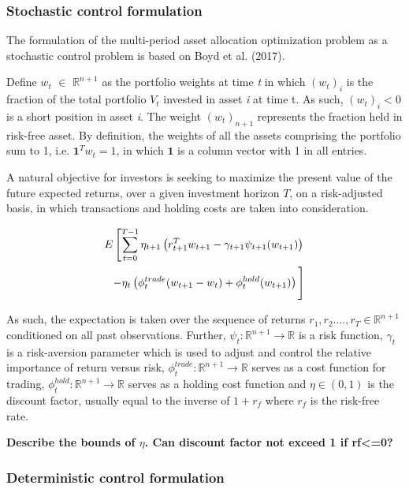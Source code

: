 \subsubsection{Stochastic control formulation}
The formulation of the multi-period asset allocation optimization problem as a stochastic control problem is based on Boyd et al. (2017). 

Define $w_t$ $\in$ $\mathbb{R}^{n+1}$ as the portfolio weights at time \textit{t} in which $(w_t)_{i}$ is the fraction of the total portfolio $V_t$ invested in asset \textit{i} at time t. As such, $(w_t)_{i} < 0$ is a short position in asset \textit{i}. The weight $(w_t)_{{n+1}}$ represents the fraction held in risk-free asset. By definition, the weights of all the assets comprising the portfolio sum to 1, i.e. $\mathbf{1}^Tw_t = 1$, in which $\mathbf{1}$ is a column vector with 1 in all entries. 

A natural objective for investors is seeking to maximize the present value of the future expected returns, over a given investment horizon $T$, on a risk-adjusted basis, in which transactions and holding costs are taken into consideration.

\begin{equation}
\begin{split}
    E\left[\sum_{t=0}^{T-1}\eta_{t+1}\left(r_{t+1}^Tw_{t+1} -\gamma_{t+1}\psi_{t+1}(w_{t+1})\right) \right. \\
    \left. -\eta_t\left(\phi_t^{trade}(w_{t+1}-w_t)+\phi_t^{hold}(w_{t+1})\right)
    \vphantom{\sum_{t=0}^{T-1}} \right]
    \label{eq: MPC_stochastic}
\end{split}
\end{equation}

As such, the expectation is taken over the sequence of returns $r_1, r_2...., r_T \in \mathbb{R}^{n+1}$ conditioned on all past observations. Further, $\psi_t:\mathbb{R}^{n+1} \rightarrow \mathbb{R}$ is a risk function, $\gamma_t$ is a risk-aversion parameter which is used to adjust and control the relative importance of return versus risk, $\phi_t^{trade}: \mathbb{R}^{n+1}\rightarrow\mathbb{R}$ serves as a cost function for trading, $\phi_t^{hold}: \mathbb{R}^{n+1}\rightarrow\mathbb{R}$ serves as a holding cost function and $\eta \in (0,1)$ is the discount factor, usually equal to the inverse of $1+r_f$ where $r_f$ is the risk-free rate.

\textbf{Describe the bounds of $\eta$. Can discount factor not exceed 1 if rf<=0?}

\subsubsection{Deterministic control formulation}

